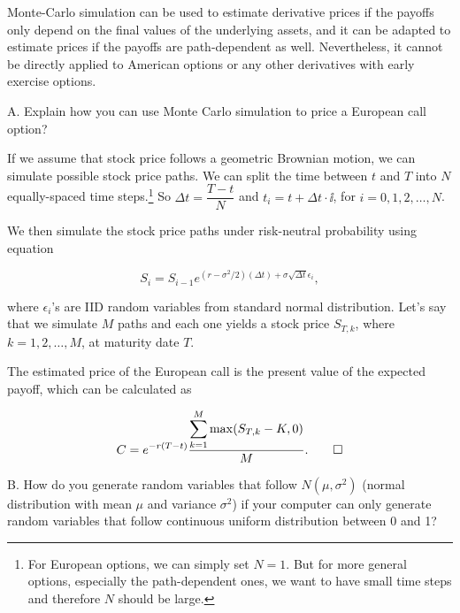 Monte-Carlo simulation can be used to estimate derivative prices if the payoffs only depend
on the final values of the underlying assets, and it can be adapted to estimate prices if
the payoffs are path-dependent as well. Nevertheless, it cannot be directly applied to
American options or any other derivatives with early exercise options.

\begin{problem}{A. Explain how you can use Monte Carlo simulation to price a European call option?}
\end{problem}

\begin{solution}
If we assume that stock price follows a geometric Brownian motion, we can simulate
possible stock price paths. We can split the time between $t$ and $T$ into $N$ equally-spaced
time steps.\footnote[10]{For European options, we can simply set $N=1$. But for more general
options, especially the path-dependent ones, we want to have small time steps and therefore
$N$ should be large.} So $\Delta t=\dfrac{T-t}{N}$ and $t_i=t+\Delta t\cdot \ii$, for
$i=0,1,2,\ldots,N$.

We then simulate the stock price paths under risk-neutral probability
using equation

\[
S_i=S_{i-1}e^{(r-\sigma^2/2)(\Delta t)+\sigma\sqrt{\Delta t}\epsilon_i},
\]

where $\epsilon_i$'s are IID random variables from standard normal distribution. Let's say
that we simulate $M$ paths and each one yields a stock price $S_{T,k}$, where
$k=1,2,\ldots,M$, at maturity date $T$.


The estimated price of the European call is the present value of the expected payoff,
which can be calculated as

\[
C=e^{-r(T-t)}\frac{\displaystyle\sum_{k=1}^{M}\max(S_{T,k}-K,0)}{M}.\qedhere
\]

\end{solution}

\begin{problem}{B. How do you generate random variables that follow $N(\mu,\sigma^2)$ (normal
distribution with mean $\mu$ and variance $\sigma^2$) if your computer can only generate
random variables that follow continuous uniform distribution between 0 and 1?}
\end{problem}

